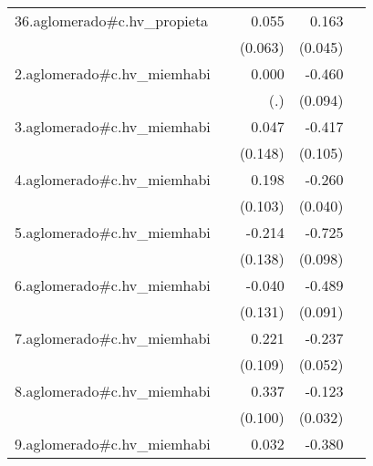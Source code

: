 {\begin{longtable}{l*{4}{D{.}{.}{-1}}}
\addlinespace
36.aglomerado#c.hv\_propieta&                     &       0.055         &       0.163\sym{***}&                     \\
            &                     &     (0.063)         &     (0.045)         &                     \\
\addlinespace
2.aglomerado#c.hv\_miemhabi&                     &       0.000         &      -0.460\sym{***}&                     \\
            &                     &         (.)         &     (0.094)         &                     \\
\addlinespace
3.aglomerado#c.hv\_miemhabi&                     &       0.047         &      -0.417\sym{***}&                     \\
            &                     &     (0.148)         &     (0.105)         &                     \\
\addlinespace
4.aglomerado#c.hv\_miemhabi&                     &       0.198         &      -0.260\sym{***}&                     \\
            &                     &     (0.103)         &     (0.040)         &                     \\
\addlinespace
5.aglomerado#c.hv\_miemhabi&                     &      -0.214         &      -0.725\sym{***}&                     \\
            &                     &     (0.138)         &     (0.098)         &                     \\
\addlinespace
6.aglomerado#c.hv\_miemhabi&                     &      -0.040         &      -0.489\sym{***}&                     \\
            &                     &     (0.131)         &     (0.091)         &                     \\
\addlinespace
7.aglomerado#c.hv\_miemhabi&                     &       0.221\sym{*}  &      -0.237\sym{***}&                     \\
            &                     &     (0.109)         &     (0.052)         &                     \\
\addlinespace
8.aglomerado#c.hv\_miemhabi&                     &       0.337\sym{***}&      -0.123\sym{***}&                     \\
            &                     &     (0.100)         &     (0.032)         &                     \\
\addlinespace
9.aglomerado#c.hv\_miemhabi&                     &       0.032         &      -0.380\sym{***}&                     \\

\end{longtable}}
